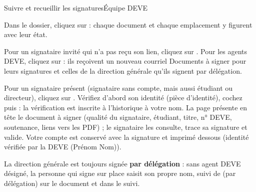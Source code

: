 \documentclass[11pt,a4paper]{article}
\begin{document}
\begin{procedure}{Suivre et recueillir les signatures}{Équipe DEVE}
\begin{etapes}
  \item Dans le dossier, cliquez sur  : chaque
        document et chaque emplacement y figurent avec leur état.
  \item Pour un signataire invité qui n'a pas reçu son lien, cliquez sur
        . Pour les agents DEVE, cliquez sur
         : ils reçoivent un nouveau courriel \og Documents à
        signer\fg{} pour leurs signatures et celles de la direction générale
        qu'ils signent par délégation.
  \item Pour un signataire présent (signataire sans compte, mais aussi
        étudiant ou directeur), cliquez sur . Vérifiez
        d'abord son identité (pièce d'identité), cochez  puis  : la vérification est inscrite à l'historique à votre nom.
        La page présente en tête le document à signer (qualité du signataire,
        étudiant, titre, n° DEVE, soutenance, liens vers les PDF) ; le
        signataire les consulte, trace sa signature et valide. Votre compte est
        conservé avec la signature et imprimé dessous (\og identité vérifiée par
        la DEVE (Prénom Nom)\fg{}).
  \item La direction générale est toujours signée \textbf{par délégation} :
        sans agent DEVE désigné, la personne qui signe sur place saisit son
        propre nom, suivi de \og (par délégation)\fg{} sur le document et dans
        le suivi.
\end{etapes}
\end{procedure}



\end{document}
